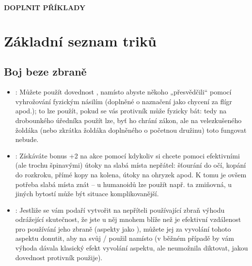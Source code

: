 \documentclass[../main.tex]{subfiles}
\begin{document}
\textbf{DOPLNIT PŘÍKLADY}

\section{Základní seznam triků}
\label{sec:trik-zakladni}

\subsection{Boj beze zbraně}
\label{sec:trik-bbz}
\begin{itemize}
\item{}:
  \label{sec:bbz-jau}
  Můžete použít dovednost , namísto  abyste někoho „přesvědčili“ pomocí vyhrožování fyzickým násilím (doplněné o naznačení jako chycení za flígr apod.); to lze použít, pokud se vás protivník může fyzicky bát: tedy na drobounkého úředníka  použít lze, byť ho chrání zákon, ale na velezkušeného žoldáka (nebo zkrátka žoldáka doplněného o početnou družinu) toto fungovat nebude.
\item{}:
  \label{sec:bbz-slabiny}
  Získáváte bonus +2 na akce  pomocí  kdykoliv si chcete pomoci efektivními (ale trochu špinavými) útoky na slabá místa nepřátel: šťourání do očí, kopání do rozkroku, přímé kopy na kolena, útoky na ohryzek apod. K tomu je ovšem potřeba slabá místa znát – u humanoidů lze použít např. ta zmiňovná, u jiných bytostí může být situace komplikovanější.
\item{}:
  Jestliže se vám podaří vytvořit na nepříteli používající zbraň výhodu odrážející skutečnost, že jste u něj mnohem blíže než je efektivní vzdálenost pro používání jeho zbraně (aspekty jako ), můžete jej za vyvolání tohoto aspektu donutit, aby na svůj / použil  namísto  (v běžném případě by vám výhoda dávala klasický efekt vyvolání aspektu, ale neumožnila diktovat, jakou dovednost protivník použije).
\end{itemize}

  
\end{document}
